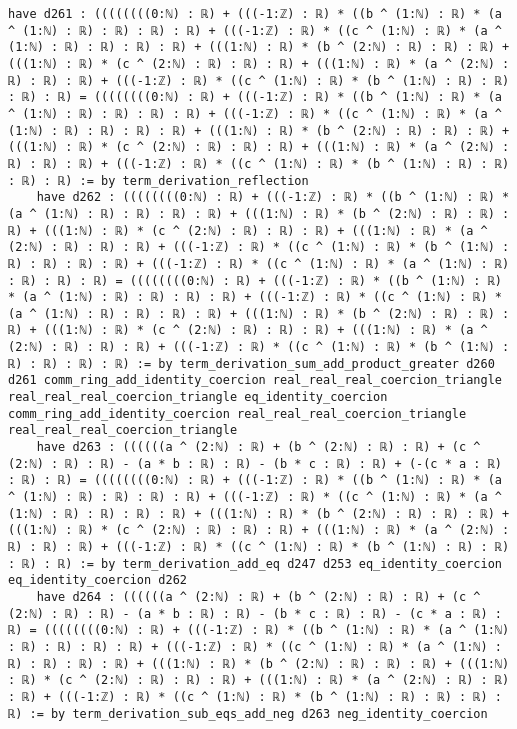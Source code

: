 \documentclass{article}
\begin{document}
\begin{tcolorbox}[colback=white!10, width=\linewidth]
\begin{lstlisting}[language=Lean4]
    have d261 : ((((((((0:ℕ) : ℝ) + (((-1:ℤ) : ℝ) * ((b ^ (1:ℕ) : ℝ) * (a ^ (1:ℕ) : ℝ) : ℝ) : ℝ) : ℝ) + (((-1:ℤ) : ℝ) * ((c ^ (1:ℕ) : ℝ) * (a ^ (1:ℕ) : ℝ) : ℝ) : ℝ) : ℝ) + (((1:ℕ) : ℝ) * (b ^ (2:ℕ) : ℝ) : ℝ) : ℝ) + (((1:ℕ) : ℝ) * (c ^ (2:ℕ) : ℝ) : ℝ) : ℝ) + (((1:ℕ) : ℝ) * (a ^ (2:ℕ) : ℝ) : ℝ) : ℝ) + (((-1:ℤ) : ℝ) * ((c ^ (1:ℕ) : ℝ) * (b ^ (1:ℕ) : ℝ) : ℝ) : ℝ) : ℝ) = ((((((((0:ℕ) : ℝ) + (((-1:ℤ) : ℝ) * ((b ^ (1:ℕ) : ℝ) * (a ^ (1:ℕ) : ℝ) : ℝ) : ℝ) : ℝ) + (((-1:ℤ) : ℝ) * ((c ^ (1:ℕ) : ℝ) * (a ^ (1:ℕ) : ℝ) : ℝ) : ℝ) : ℝ) + (((1:ℕ) : ℝ) * (b ^ (2:ℕ) : ℝ) : ℝ) : ℝ) + (((1:ℕ) : ℝ) * (c ^ (2:ℕ) : ℝ) : ℝ) : ℝ) + (((1:ℕ) : ℝ) * (a ^ (2:ℕ) : ℝ) : ℝ) : ℝ) + (((-1:ℤ) : ℝ) * ((c ^ (1:ℕ) : ℝ) * (b ^ (1:ℕ) : ℝ) : ℝ) : ℝ) : ℝ) := by term_derivation_reflection
    have d262 : ((((((((0:ℕ) : ℝ) + (((-1:ℤ) : ℝ) * ((b ^ (1:ℕ) : ℝ) * (a ^ (1:ℕ) : ℝ) : ℝ) : ℝ) : ℝ) + (((1:ℕ) : ℝ) * (b ^ (2:ℕ) : ℝ) : ℝ) : ℝ) + (((1:ℕ) : ℝ) * (c ^ (2:ℕ) : ℝ) : ℝ) : ℝ) + (((1:ℕ) : ℝ) * (a ^ (2:ℕ) : ℝ) : ℝ) : ℝ) + (((-1:ℤ) : ℝ) * ((c ^ (1:ℕ) : ℝ) * (b ^ (1:ℕ) : ℝ) : ℝ) : ℝ) : ℝ) + (((-1:ℤ) : ℝ) * ((c ^ (1:ℕ) : ℝ) * (a ^ (1:ℕ) : ℝ) : ℝ) : ℝ) : ℝ) = ((((((((0:ℕ) : ℝ) + (((-1:ℤ) : ℝ) * ((b ^ (1:ℕ) : ℝ) * (a ^ (1:ℕ) : ℝ) : ℝ) : ℝ) : ℝ) + (((-1:ℤ) : ℝ) * ((c ^ (1:ℕ) : ℝ) * (a ^ (1:ℕ) : ℝ) : ℝ) : ℝ) : ℝ) + (((1:ℕ) : ℝ) * (b ^ (2:ℕ) : ℝ) : ℝ) : ℝ) + (((1:ℕ) : ℝ) * (c ^ (2:ℕ) : ℝ) : ℝ) : ℝ) + (((1:ℕ) : ℝ) * (a ^ (2:ℕ) : ℝ) : ℝ) : ℝ) + (((-1:ℤ) : ℝ) * ((c ^ (1:ℕ) : ℝ) * (b ^ (1:ℕ) : ℝ) : ℝ) : ℝ) : ℝ) := by term_derivation_sum_add_product_greater d260 d261 comm_ring_add_identity_coercion real_real_real_coercion_triangle real_real_real_coercion_triangle eq_identity_coercion comm_ring_add_identity_coercion real_real_real_coercion_triangle real_real_real_coercion_triangle
    have d263 : ((((((a ^ (2:ℕ) : ℝ) + (b ^ (2:ℕ) : ℝ) : ℝ) + (c ^ (2:ℕ) : ℝ) : ℝ) - (a * b : ℝ) : ℝ) - (b * c : ℝ) : ℝ) + (-(c * a : ℝ) : ℝ) : ℝ) = ((((((((0:ℕ) : ℝ) + (((-1:ℤ) : ℝ) * ((b ^ (1:ℕ) : ℝ) * (a ^ (1:ℕ) : ℝ) : ℝ) : ℝ) : ℝ) + (((-1:ℤ) : ℝ) * ((c ^ (1:ℕ) : ℝ) * (a ^ (1:ℕ) : ℝ) : ℝ) : ℝ) : ℝ) + (((1:ℕ) : ℝ) * (b ^ (2:ℕ) : ℝ) : ℝ) : ℝ) + (((1:ℕ) : ℝ) * (c ^ (2:ℕ) : ℝ) : ℝ) : ℝ) + (((1:ℕ) : ℝ) * (a ^ (2:ℕ) : ℝ) : ℝ) : ℝ) + (((-1:ℤ) : ℝ) * ((c ^ (1:ℕ) : ℝ) * (b ^ (1:ℕ) : ℝ) : ℝ) : ℝ) : ℝ) := by term_derivation_add_eq d247 d253 eq_identity_coercion eq_identity_coercion d262
    have d264 : ((((((a ^ (2:ℕ) : ℝ) + (b ^ (2:ℕ) : ℝ) : ℝ) + (c ^ (2:ℕ) : ℝ) : ℝ) - (a * b : ℝ) : ℝ) - (b * c : ℝ) : ℝ) - (c * a : ℝ) : ℝ) = ((((((((0:ℕ) : ℝ) + (((-1:ℤ) : ℝ) * ((b ^ (1:ℕ) : ℝ) * (a ^ (1:ℕ) : ℝ) : ℝ) : ℝ) : ℝ) + (((-1:ℤ) : ℝ) * ((c ^ (1:ℕ) : ℝ) * (a ^ (1:ℕ) : ℝ) : ℝ) : ℝ) : ℝ) + (((1:ℕ) : ℝ) * (b ^ (2:ℕ) : ℝ) : ℝ) : ℝ) + (((1:ℕ) : ℝ) * (c ^ (2:ℕ) : ℝ) : ℝ) : ℝ) + (((1:ℕ) : ℝ) * (a ^ (2:ℕ) : ℝ) : ℝ) : ℝ) + (((-1:ℤ) : ℝ) * ((c ^ (1:ℕ) : ℝ) * (b ^ (1:ℕ) : ℝ) : ℝ) : ℝ) : ℝ) := by term_derivation_sub_eqs_add_neg d263 neg_identity_coercion

\end{lstlisting}
\end{tcolorbox}
\end{document}
